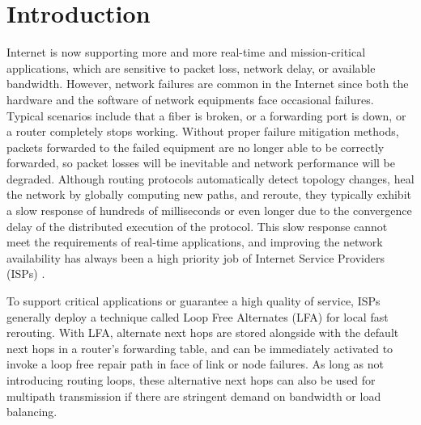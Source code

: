 \section{Introduction}
Internet is now supporting more and more real-time and mission-critical applications, 
which are sensitive to packet loss, network delay, or available bandwidth. 
However, network failures are common in the Internet \cite{Zheng}\cite{20083511494785} 
since both the hardware and the software of network equipments face occasional failures. 
Typical scenarios include that a fiber is broken, or a forwarding port is down, 
or a router completely stops working. 
Without proper failure mitigation methods, packets forwarded to the failed equipment are 
no longer able to be correctly forwarded, so packet losses will be inevitable 
and network performance will be degraded. 
Although routing protocols automatically detect topology changes, 
heal the network by globally computing new paths, and reroute, 
they typically exhibit a slow response of hundreds of milliseconds or even longer 
due to the convergence delay of the distributed execution of the protocol.  
This slow response cannot meet the requirements of real-time applications, 
and improving the network availability has always been a high priority job of Internet Service 
Providers (ISPs) \cite{Scalable,Jose2016Optimal,Yang2014Keep,Elhourani2016IP,Liu2013Ensuring,Stephens2016Scalable}. 

To support critical applications or guarantee a high quality of service, ISPs generally deploy 
a technique called Loop Free Alternates (LFA) \cite{IPFRR, LFA} for local fast rerouting.
With LFA, alternate next hops are stored alongside with the default next hops in a router's 
forwarding table, and can be immediately activated to invoke a loop free repair path 
in face of link or node failures. As long as not introducing routing loops, 
these alternative next hops can also be used for multipath transmission 
if there are stringent demand on bandwidth or load balancing.

